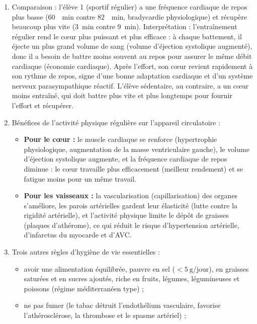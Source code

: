 \documentclass[11pt]{article}
\newcommand{\cle}[1]{{\popxbold\color{popdark}#1}}
\begin{document}
\begin{corrige}
\begin{enumerate}
\item Comparaison : l'élève 1 (sportif régulier) a une fréquence cardiaque de repos plus basse (\SI{60}{\per\minute} contre \SI{82}{\per\minute}, \cle{bradycardie} physiologique) et récupère beaucoup plus vite (\SI{3}{\minute} contre \SI{9}{\minute}). Interprétation : l'entraînement régulier rend le cœur plus puissant et plus efficace : à chaque battement, il éjecte un plus grand volume de sang (volume d'éjection systolique augmenté), donc il a besoin de battre moins souvent au repos pour assurer le même débit cardiaque (économie cardiaque). Après l'effort, son cœur revient rapidement à son rythme de repos, signe d'une bonne adaptation cardiaque et d'un système nerveux parasympathique réactif. L'élève sédentaire, au contraire, a un cœur moins entraîné, qui doit battre plus vite et plus longtemps pour fournir l'effort et récupérer.
\item Bénéfices de l'activité physique régulière sur l'appareil circulatoire :
\begin{itemize}
\item \textbf{Pour le cœur :} le muscle cardiaque se renforce (hypertrophie physiologique, augmentation de la masse ventriculaire gauche), le volume d'éjection systolique augmente, et la fréquence cardiaque de repos diminue : le cœur travaille plus efficacement (meilleur rendement) et se fatigue moins pour un même travail.
\item \textbf{Pour les vaisseaux :} la vascularisation (capillarisation) des organes s'améliore, les parois artérielles gardent leur élasticité (lutte contre la rigidité artérielle), et l'activité physique limite le dépôt de graisses (plaques d'athérome), ce qui réduit le risque d'hypertension artérielle, d'infarctus du myocarde et d'AVC.
\end{itemize}
\item Trois autres règles d'hygiène de vie essentielles :
\begin{itemize}
\item avoir une alimentation équilibrée, pauvre en sel ($< \SI{5}{\gram}$/jour), en graisses saturées et en sucres ajoutés, riche en fruits, légumes, légumineuses et poissons (régime méditerranéen type) ;
\item ne pas fumer (le tabac détruit l'endothélium vasculaire, favorise l'athérosclérose, la thrombose et le spasme artériel) ;

\end{itemize}
\end{enumerate}
\end{corrige}
\end{document}
